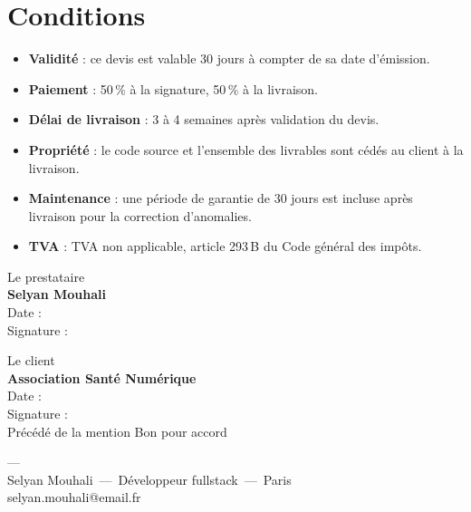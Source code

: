 \documentclass[12pt, a4paper]{article}
\begin{document}
\vspace{0.8cm}

\section{Conditions}

\begin{notebox}
\begin{itemize}[leftmargin=1.5em, itemsep=0.3em]
  \item \textbf{Validit\'e} : ce devis est valable 30 jours \`a compter de sa date d'\'emission.
  \item \textbf{Paiement} : 50\,\% \`a la signature, 50\,\% \`a la livraison.
  \item \textbf{D\'elai de livraison} : 3 \`a 4 semaines apr\`es validation du devis.
  \item \textbf{Propri\'et\'e} : le code source et l'ensemble des livrables sont c\'ed\'es au client \`a la livraison.
  \item \textbf{Maintenance} : une p\'eriode de garantie de 30 jours est incluse apr\`es livraison pour la correction d'anomalies.
  \item \textbf{TVA} : TVA non applicable, article 293\,B du Code g\'en\'eral des imp\^ots.
\end{itemize}
\end{notebox}

\vspace{1.5cm}

\begin{minipage}[t]{0.45\textwidth}
{\small\textcolor{gris400}{Le prestataire}}\\[0.5em]
\textbf{Selyan Mouhali}\\[0.3em]
{\small Date :}\\[2cm]
{\small Signature :}
\end{minipage}%
\hfill
\begin{minipage}[t]{0.45\textwidth}
{\small\textcolor{gris400}{Le client}}\\[0.5em]
\textbf{Association Sant\'e Num\'erique}\\[0.3em]
{\small Date :}\\[2cm]
{\small Signature :}\\
{\footnotesize\textcolor{gris400}{Pr\'ec\'ed\'e de la mention \og Bon pour accord \fg}}
\end{minipage}

\vfill

\begin{center}
\small\textcolor{gris400}{---}\\[0.3em]
\small\textcolor{gris400}{Selyan Mouhali~---~D\'eveloppeur fullstack~---~Paris}\\[0.2em]
\small\textcolor{gris400}{selyan.mouhali@email.fr}
\end{center}
\end{document}
